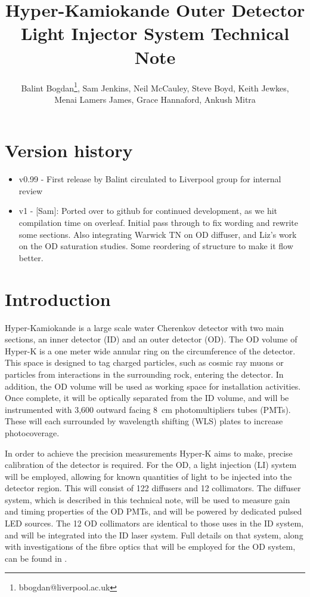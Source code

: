 \documentclass[a4paper,11pt]{article}
\begin{document}
\title{Hyper-Kamiokande Outer Detector Light Injector System Technical Note}
\author{Balint Bogdan\footnote{bbogdan@liverpool.ac.uk}, Sam Jenkins, Neil McCauley, Steve Boyd, Keith Jewkes,\\Menai Lamers James, Grace Hannaford, Ankush Mitra}

\maketitle

\tableofcontents

\newpage

\section{Version history}
\begin{itemize}
\item v0.99 - First release by Balint circulated to Liverpool group for internal review
\item v1 - [Sam]: Ported over to github for continued development, as we hit compilation time on overleaf. Initial pass through to fix wording and rewrite some sections. Also integrating Warwick TN on OD diffuser, and Liz's work on the OD saturation studies. Some reordering of structure to make it flow better.
\end{itemize}

\newpage

\section{Introduction}
\label{sec:intro}

Hyper-Kamiokande is a large scale water Cherenkov detector with two main sections, an inner detector (ID) and an outer detector (OD). The OD volume of Hyper-K is a one meter wide annular ring on the circumference of the detector. This space is designed to tag charged particles, such as cosmic ray muons or particles from interactions in the surrounding rock, entering the detector. In addition, the OD volume will be used as working space for installation activities. Once complete, it will be optically separated from the ID volume, and will be instrumented with 3,600 outward facing 8~cm photomultipliers tubes (PMTs). These will each surrounded by wavelength shifting (WLS) plates to increase photocoverage.

In order to achieve the precision measurements Hyper-K aims to make, precise calibration of the detector is required. For the OD, a light injection (LI) system will be employed, allowing for known quantities of light to be injected into the detector region. This will consist of 122 diffusers and 12 collimators. The diffuser system, which is described in this technical note, will be used to measure gain and timing properties of the OD PMTs, and will be powered by dedicated pulsed LED sources. The 12 OD collimators are identical to those uses in the ID system, and will be integrated into the ID laser system. Full details on that system, along with investigations of the fibre optics that will be employed for the OD system, can be found in \cite{TN91}.
\end{document}
